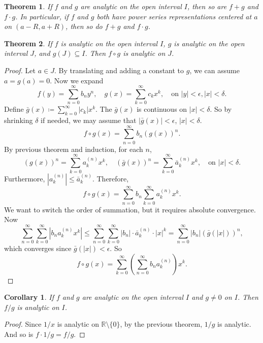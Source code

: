 \documentclass[12pt]{article}
\theoremstyle{plain}
\newtheorem{thm}{Theorem}
\newtheorem*{corollary}{Corollary}
\theoremstyle{definition}
\begin{document}
\begin{thm}
    If $f$ and $g$ are analytic on the open interval $I$, then so are $f+g$ and $f\cdot g$.
    In particular, if $f$ and $g$ both have power series representations centered at $a$ on $(a-R,a+R)$, then
    so do $f+g$ and $f\cdot g$.
\end{thm}

\begin{thm}
    If $f$ is analytic on the open interval $I$, $g$ is analytic on the open interval $J$, and
    $g(J)\subseteq I$.
    Then $f\circ g$ is analytic on $J$.
\end{thm}
\begin{proof}
    Let $a\in J$.
    By translating and adding a constant to $g$, we can assume $a=g(a)=0$.
    Now we expand
    \[ f(y) = \sum_{n=0}^\infty b_n y^n,\quad g(x)=\sum_{k=0}^\infty c_k x^k,\quad\text{on }|y|<\epsilon,
    |x|<\delta.\]
    Define $\bar{g}(x)\coloneqq \sum_{k=0}^\infty |c_k|x^k$.
    The $\bar{g}(x)$ is continuous on $|x|<\delta$.
    So by shrinking $\delta$ if needed, we may assume that $|\bar{g}(x)|<\epsilon$, $|x|<\delta$.
    $$f\circ g(x)=\sum_{n=0}^\infty b_n(g(x))^n.$$
    By previous theorem and induction, for each $n$,
    \[(g(x))^n = \sum_{k=0}^\infty a_k^{(n)} x^k,\quad (\bar{g}(x))^n=\sum_{k=0}^\infty
    \bar{a}_k^{(n)}x^k,\quad\text{on }|x|<\delta.\]
    Furthermore, $|a_k^{(n)}|\leq \bar{a}_k^{(n)}$.
    Therefore,
    \[f\circ g(x) = \sum_{n=0}^\infty b_n \sum_{k=0}^\infty a_k^{(n)}x^k.\]
    We want to switch the order of summation, but it requires absolute convergence.
    Now
    $$\sum_{n=0}^\infty \sum_{k=0}^\infty |b_na_k^{(n)}x^k| \leq \sum_{n=0}^\infty \sum_{k=0}^\infty
    |b_n|\cdot\bar{a}_k^{(n)}\cdot |x|^k
    = \sum_{n=0}^\infty |b_n|(\bar{g}(|x|))^n,$$
    which converges since $\bar{g}(|x|)<\epsilon$.
    So
    \[f\circ g(x)=\sum_{k=0}^\infty\left( \sum_{n=0}^\infty b_na_k^{(n)}\right) x^k.\]
\end{proof}

\begin{corollary}
    If $f$ and $g$ are analytic on the open interval $I$ and $g\neq 0$ on $I$.
    Then $f/g$ is analytic on $I$.
\end{corollary}
\begin{proof}
    Since $1/x$ is analytic on $\mathbb{R}\setminus\{0\}$, by the previous theorem, $1/g$ is analytic.
    And so is $f\cdot 1/g=f/g$.
\end{proof}
\end{document}
